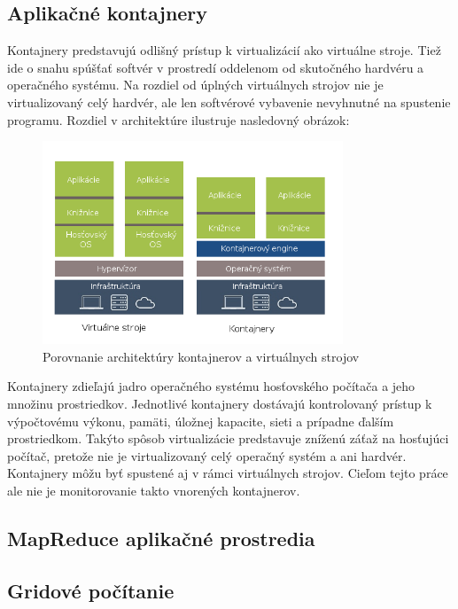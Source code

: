 \documentclass[11pt,final,oneside]{fithesis}
\begin{document}
\subsection{Aplikačné kontajnery}
Kontajnery predstavujú odlišný prístup k virtualizácií ako virtuálne stroje. Tiež ide o snahu spúšťať softvér v prostredí oddelenom od skutočného hardvéru a operačného systému. Na rozdiel od úplných virtuálnych strojov 
nie je virtualizovaný celý hardvér, ale len softvérové vybavenie nevyhnutné na spustenie programu. Rozdiel v architektúre ilustruje nasledovný obrázok: 
\begin{figure}[h]
\begin{center}
       \includegraphics[width=0.8\textwidth]{images/kontajnery-virtualky.png}
       \caption{Porovnanie architektúry kontajnerov a virtuálnych strojov}
\end{center}
\end{figure}
Kontajnery zdieľajú jadro operačného systému hosťovského počítača a jeho množinu prostriedkov. Jednotlivé kontajnery dostávajú kontrolovaný prístup k výpočtovému výkonu, pamäti, úložnej kapacite, 
sieti a prípadne ďalším prostriedkom. Takýto spôsob virtualizácie predstavuje zníženú záťaž na hosťujúci počítač, pretože nie je virtualizovaný celý operačný systém a ani hardvér.
\\Kontajnery môžu byť spustené aj v rámci virtuálnych strojov. Cieľom tejto práce ale nie je monitorovanie takto vnorených kontajnerov.

\subsection{MapReduce aplikačné prostredia}

\subsection{Gridové počítanie}
\end{document}
